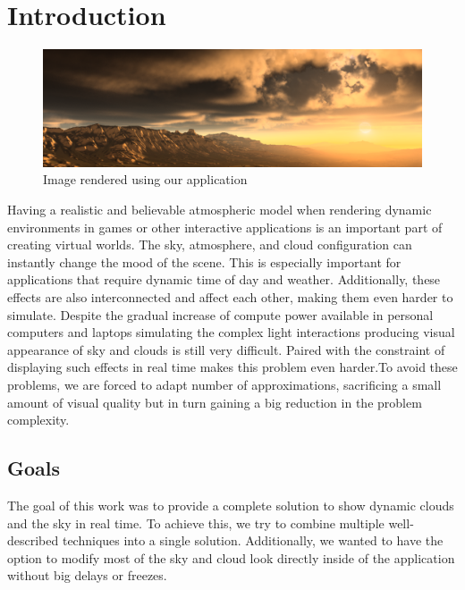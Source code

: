 \documentclass{ctuthesis}
\begin{document}
\maketitle

\chapter{Introduction}
\begin{figure}[h]
    \includegraphics[width=1.0\textwidth]{media/title_image.png}
    \caption[Introduction result image]{Image rendered using our application}
\end{figure}
Having a realistic and believable atmospheric model when rendering dynamic environments in games or other
interactive applications is an important part of creating virtual worlds. The sky, atmosphere, and cloud configuration can 
instantly change the mood of the scene. This is especially important for applications that require
dynamic time of day and weather. Additionally, these effects are also interconnected and affect each other,
making them even harder to simulate. Despite the gradual increase of compute power available in personal 
computers and laptops simulating the complex light interactions producing visual appearance of sky and
clouds is still very difficult. Paired with the constraint of displaying such effects in real time
makes this problem even harder.To avoid these problems, we are forced to adapt number of approximations,
sacrificing a small amount of visual quality but in turn gaining a big reduction in the problem complexity. 

\section{Goals}
The goal of this work was to provide a complete solution to show dynamic clouds and the sky in real time.
To achieve this, we try to combine multiple well-described techniques into a single solution. Additionally,
we wanted to have the option to modify most of the sky and cloud look directly inside of the application
without big delays or freezes. 
\end{document}
